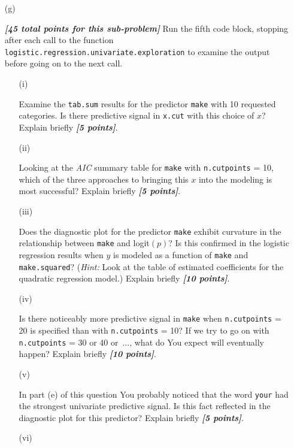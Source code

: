 \documentclass[12pt]{article}
\newcommand{\bi}[1]{\textbf{\textit{#1}}}
\begin{document}
\begin{itemize}

\item[(g)]

\bi{[45 total points for this sub-problem]} Run the fifth code block, stopping after each call to the function \texttt{logistic.regression.univariate.exploration} to examine the output before going on to the next call.

\begin{itemize}

\item[(i)]

Examine the \texttt{tab.sum} results for the predictor \texttt{make} with 10 requested categories. Is there predictive signal in \texttt{x.cut} with this choice of $x$? Explain briefly \bi{[5 points]}.

\item[(ii)]

Looking at the \textit{AIC} summary table for \texttt{make} with \texttt{n.cutpoints} = 10, which of the three approaches to bringing this $x$ into the modeling is most successful? Explain briefly \bi{[5 points]}.

\item[(iii)]

Does the diagnostic plot for the predictor \texttt{make} exhibit curvature in the relationship between \texttt{make} and logit$( p )$? Is this confirmed in the logistic regression results when $y$ is modeled as a function of \texttt{make} and \texttt{make.squared}? (\textit{Hint:} Look at the table of estimated coefficients for the quadratic regression model.) Explain briefly \bi{[10 points]}.

\item[(iv)]

Is there noticeably more predictive signal in \texttt{make} when \texttt{n.cutpoints} = 20 is specified than with \texttt{n.cutpoints} = 10? If we try to go on with \texttt{n.cutpoints} = 30 or 40 or~..., what do You expect will eventually happen?  Explain briefly \bi{[10 points]}.

\item[(v)]

In part (e) of this question You probably noticed that the word \texttt{your} 
had the strongest univariate predictive signal. Is this fact reflected in the diagnostic plot for this predictor? Explain briefly \bi{[5 points]}.

\item[(vi)]


\end{itemize}
\end{itemize}
\end{document}
